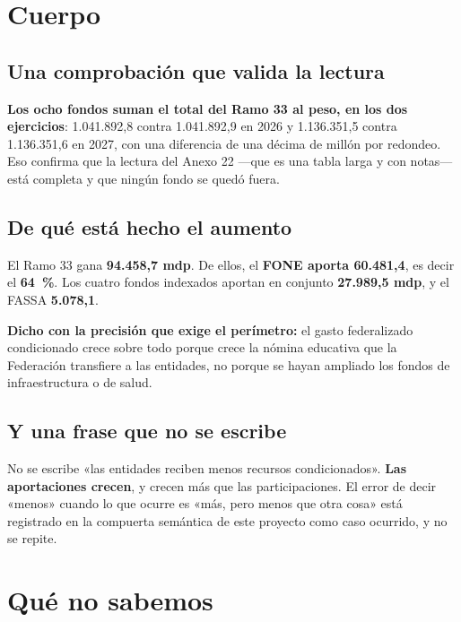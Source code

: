 \section{Cuerpo}

\subsection*{Una comprobación que valida la lectura}

\textbf{Los ocho fondos suman el total del Ramo 33 al peso, en los dos ejercicios}:
1.041.892,8 contra 1.041.892,9 en 2026 y 1.136.351,5 contra 1.136.351,6 en 2027, con una
diferencia de una décima de millón por redondeo. Eso confirma que la lectura del Anexo 22
---que es una tabla larga y con notas--- está completa y que ningún fondo se quedó fuera.

\subsection*{De qué está hecho el aumento}

El Ramo 33 gana \textbf{94.458,7 mdp}. De ellos, el \textbf{FONE aporta 60.481,4}, es decir
el \textbf{64~\%}. Los cuatro fondos indexados aportan en conjunto \textbf{27.989,5 mdp}, y
el FASSA \textbf{5.078,1}.

\textbf{Dicho con la precisión que exige el perímetro:} el gasto federalizado condicionado
crece sobre todo porque crece la nómina educativa que la Federación transfiere a las
entidades, no porque se hayan ampliado los fondos de infraestructura o de salud.

\subsection*{Y una frase que no se escribe}

No se escribe «las entidades reciben menos recursos condicionados». \textbf{Las aportaciones
crecen}, y crecen más que las participaciones. El error de decir «menos» cuando lo que
ocurre es «más, pero menos que otra cosa» está registrado en la compuerta semántica de este
proyecto como caso ocurrido, y no se repite.

\section{Qué no sabemos}

